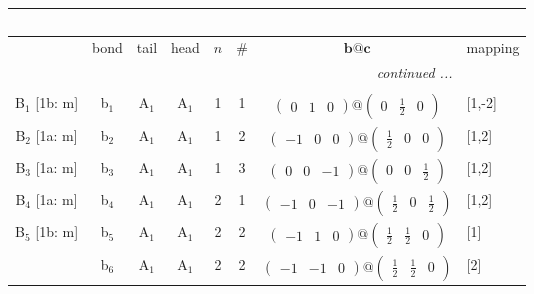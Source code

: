 \documentclass[fleqn,10pt,landscape]{article}
\begin{document}
\begin{itemize}
\begin{center}
\begin{longtable}{cc|cc|c|c|c|l}
\multicolumn{7}{l}{\tablename\ \thetable{}} \\
 \hline \hline
 & bond & tail & head & $n$ & \# & $\bm{b}@\bm{c}$ & mapping \\ \hline \endhead

 \hline \hline
\multicolumn{7}{r}{\footnotesize\it continued ...} \\ \endfoot

 \hline \hline
\multicolumn{7}{r}{} \\ \endlastfoot

B$_{1}$ [1b: m] & b$_{1}$ & A$_{1}$ & A$_{1}$ & 1 & 1 & $\begin{pmatrix} 0 & 1 & 0 \end{pmatrix}@\begin{pmatrix} 0 & \frac{1}{2} & 0 \end{pmatrix}$ & [1,-2] \\ \hline
B$_{2}$ [1a: m] & b$_{2}$ & A$_{1}$ & A$_{1}$ & 1 & 2 & $\begin{pmatrix} -1 & 0 & 0 \end{pmatrix}@\begin{pmatrix} \frac{1}{2} & 0 & 0 \end{pmatrix}$ & [1,2] \\ \hline
B$_{3}$ [1a: m] & b$_{3}$ & A$_{1}$ & A$_{1}$ & 1 & 3 & $\begin{pmatrix} 0 & 0 & -1 \end{pmatrix}@\begin{pmatrix} 0 & 0 & \frac{1}{2} \end{pmatrix}$ & [1,2] \\ \hline
B$_{4}$ [1a: m] & b$_{4}$ & A$_{1}$ & A$_{1}$ & 2 & 1 & $\begin{pmatrix} -1 & 0 & -1 \end{pmatrix}@\begin{pmatrix} \frac{1}{2} & 0 & \frac{1}{2} \end{pmatrix}$ & [1,2] \\ \hline
B$_{5}$ [1b: m] & b$_{5}$ & A$_{1}$ & A$_{1}$ & 2 & 2 & $\begin{pmatrix} -1 & 1 & 0 \end{pmatrix}@\begin{pmatrix} \frac{1}{2} & \frac{1}{2} & 0 \end{pmatrix}$ & [1] \\
& b$_{6}$ & A$_{1}$ & A$_{1}$ & 2 & 2 & $\begin{pmatrix} -1 & -1 & 0 \end{pmatrix}@\begin{pmatrix} \frac{1}{2} & \frac{1}{2} & 0 \end{pmatrix}$ & [2] \\ \hline

\end{longtable}
\end{center}
\end{itemize}
\end{document}
